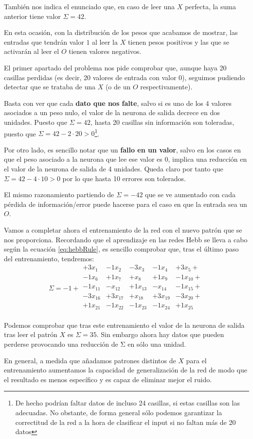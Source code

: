 \begin{problem}[3]
También nos indica el enunciado que, en caso de leer una $X$ perfecta, la suma anterior tiene valor $Σ=42$.

En esta ocasión, con la distribución de los pesos que acabamos de mostrar, las entradas que tendrán valor $1$ al leer la $X$ tienen pesos positivos y las que se activarán al leer el $O$ tienen valores negativos.

\spart
El primer apartado del problema nos pide comprobar que, aunque haya 20 casillas perdidas (es decir, 20 valores de entrada con valor 0), seguimos pudiendo detectar que se trataba de una $X$ (o de un $O$ respectivamente).

Basta con ver que cada \textbf{dato que nos falte}, salvo si es uno de los 4 valores asociados a un peso nulo, el valor de la neurona de salida decrece en dos unidades. Puesto que $Σ=42$, hasta 20 casillas sin información son toleradas, puesto que $Σ=42-2\cdot 20 > 0$\footnote{De hecho podrían faltar datos de incluso 24 casillas, si estas casillas son las adecuadas. No obstante, de forma general sólo podemos garantizar la correctitud de la red a la hora de clasificar el input si no faltan más de 20 datos}.

\spart
Por otro lado, es sencillo notar que un \textbf{fallo en un valor}, salvo en los casos en que el peso asociado a la neurona que lee ese valor es 0, implica una reducción en el valor de la neurona de salida de 4 unidades. Queda claro por tanto que $Σ=42-4\cdot 10>0$ por lo que hasta 10 errores son tolerados.

El mismo razonamiento partiendo de $Σ=-42$ que se ve aumentado con cada pérdida de información/error puede hacerse para el caso en que la entrada sea un $O$.

\spart
Vamos a completar ahora el entrenamiento de la red con el nuevo patrón que se nos proporciona. Recordando que el aprendizaje en las redes Hebb se lleva a cabo según la ecuación \ref{eq:hebbRule}, es sencillo comprobar que, tras el último paso del entrenamiento, tendremos:
\[Σ = -1 + \begin{array}{ccccc}
+3x_1& -1x_2 & -3x_3 & -1x_4 & +3x_5 +\\
-1x_6 & + 1x_7 & +x_8 & + 1x_9 &- 1x_{10} +\\
-1x_{11} & -x_{12} & +1x_{13} & -x_{14} & -1x_{15} + \\
-3x_{16} & +3x_{17} & +x_{18} & +3x_{19} & -3x_{20} + \\
+1x_{21} & -1x_{22} & -1x_{23} & -1x_{24} & +1x_{25} \\
\end{array}\]

Podemos comprobar que tras este entrenamiento el valor de la neurona de salida tras leer el patrón $X$ es $Σ=35$. Sin embargo ahora hay datos que pueden perderse provocando una reducción de Σ en sólo una unidad.

En general, a medida que añadamos patrones distintos de $X$ para el entrenamiento aumentamos la capacidad de generalización de la red de modo que el resultado es menos específico y es capaz de eliminar mejor el ruido.
\end{problem}

